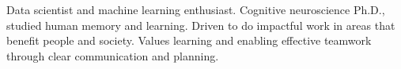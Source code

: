 
\begin{cvparagraph}

Data scientist and machine learning enthusiast. Cognitive neuroscience Ph.D., studied human memory and learning. Driven to do impactful work in areas that benefit people and society. Values learning and enabling effective teamwork through clear communication and planning.

\end{cvparagraph}
